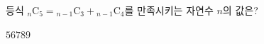 등식 ${}_n\mathrm{C}_5={}_{n-1}\mathrm{C}_3+{}_{n-1}\mathrm{C}_4$를 만족시키는 자연수 $n$의 값은?
\begin{choices32}{$5$}{$6$}{$7$}{$8$}{$9$}\end{choices32}
